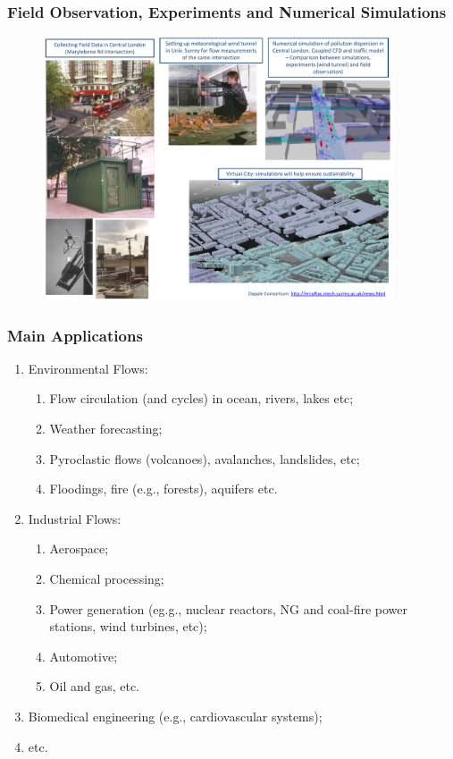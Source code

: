 \documentclass[10pt,compress,handout,ignorenonframetext]{beamer}
\begin{document}
\begin{frame}
 \frametitle{Field Observation, Experiments and Numerical Simulations} 

   \begin{figure}%
    \begin{center}
     \includegraphics[width=12.cm, height=7.8cm, clip]{./Figs/Dapple.pdf}
    \end{center}
   \end{figure}    

\end{frame}

\begin{frame}
 \frametitle{Main Applications} 
\begin{enumerate}
\item <1-> Environmental Flows:
  \begin{enumerate}
    \item <2-> Flow circulation (and cycles) in ocean, rivers, lakes etc;
    \item <3-> Weather forecasting;
    \item <4-> Pyroclastic flows (volcanoes), avalanches, landslides, etc;
    \item <5-> Floodings, fire (e.g., forests), aquifers etc.
  \end{enumerate}
\item <6-> Industrial Flows:
  \begin{enumerate}
    \item <7-> Aerospace;
    \item <8-> Chemical processing;
    \item <9-> Power generation (eg.g., nuclear reactors, NG and coal-fire power stations, wind turbines, etc);
    \item <10-> Automotive;
    \item <11-> Oil and gas, etc. 
  \end{enumerate}
\item <12-> Biomedical engineering (e.g., cardiovascular systems);
\item <13-> etc.
  
\end{enumerate}

\end{frame}
\end{document}
